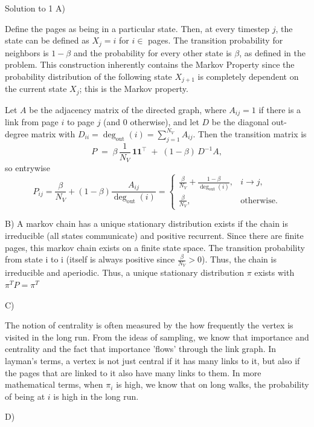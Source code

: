 \documentclass{article}
\begin{document}
\begin{tcolorbox}
Solution to 1
A)

Define the pages as being in a particular state. Then, at every timestep $j$, the state can be defined as $X_j=i$ for $i \in $ pages. The transition probability for neighbors is $1- \beta$ and the probability for every other state is $\beta$, as defined in the problem. This construction inherently contains the Markov Property since the probability distribution of the following state $X_{j+1}$ is completely dependent on the current state $X_j$; this is the Markov property. \newline

Let $A$ be the adjacency matrix of the directed graph, where $A_{ij}=1$ if there is a link from page $i$ to page $j$ (and $0$ otherwise), and let $D$ be the diagonal out-degree matrix with $D_{ii}=\deg_{\mathrm{out}}(i)=\sum_{j=1}^{N_V}A_{ij}$. Then the transition matrix is
\[
P\;=\;\beta\,\frac{1}{N_V}\,\mathbf{1}\mathbf{1}^\top\; +\; (1-\beta)\,D^{-1}A,
\]
so entrywise
\[
P_{ij}=\frac{\beta}{N_V}+(1-\beta)\frac{A_{ij}}{\deg_{\mathrm{out}}(i)}
=\begin{cases}
\frac{\beta}{N_V}+\frac{1-\beta}{\deg_{\mathrm{out}}(i)}, & i\to j,\\
\frac{\beta}{N_V}, & \text{otherwise.}
\end{cases}
\]

B)
A markov chain has a unique stationary distribution exists if the chain is irreducible (all states communicate) and positive recurrent. Since there are finite pages, this markov chain exists on a finite state space. The transition probability from state i to i (itself is always positive since $\frac{\beta}{N_V} > 0$). Thus, the chain is irreducible and aperiodic. Thus, a unique stationary distribution $\pi$ exists  with $\pi^TP = \pi^T$


C)


The notion of centrality is often measured by the how frequently the vertex is visited in the long run. From the ideas of sampling, we know that importance and centrality and the fact that importance 'flows' through the link graph. In layman's terms, a vertex is not just central if it has many links to it, but also if the pages that are linked to it also have many links to them. In more mathematical terms, when $\pi_i$ is high, we know that on long walks, the probability of being at $i$ is high in the long run. 




D) 


\end{tcolorbox}
\end{document}
